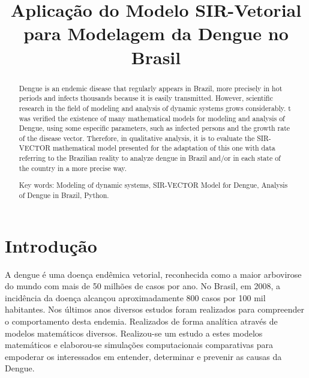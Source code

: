 \documentclass[conference]{IEEEtran}
\begin{document}
\title{Aplicação do Modelo SIR-Vetorial para Modelagem da Dengue no Brasil}

\author{
}




\maketitle

\begin{abstract}
Dengue is an endemic disease that regularly appears in Brazil, more precisely in hot periods and infects thousands because it is easily transmitted. However, scientific research in the field of modeling and analysis of dynamic systems grows considerably. t was verified the existence of many mathematical models for modeling and analysis of Dengue, using some especific parameters, such as infected persons and the growth rate of the disease vector. Therefore, in qualitative analysis, it is to evaluate the SIR-VECTOR mathematical model presented for the adaptation of this one with data referring to the Brazilian reality to analyze dengue in Brazil and/or in each state of the country in a more precise way.

Key words: Modeling of dynamic systems, SIR-VECTOR Model for Dengue, Analysis of Dengue in Brazil, Python.
\end{abstract}


\IEEEpeerreviewmaketitle

\section{Introdução}

A dengue é uma doença endêmica vetorial, reconhecida como a maior arbovirose do mundo com mais de 50 milhões de casos por ano\cite{10.1371/journal.pone.0049085}. No Brasil, em 2008, a incidência da doença alcançou aproximadamente 800
casos por 100 mil habitantes\cite{bohm2016dengue}. Nos últimos anos diversos estudos foram realizados para compreender o comportamento desta endemia. Realizados de forma analítica através de modelos matemáticos diversos\cite{kermack1927contribution,bailey1975mathematical,daley2001epidemic,brauer2001mathematical,nishiura2006mathematical,10.1371/journal.pone.0049085}. Realizou-se um estudo a estes modelos matemáticos e elaborou-se simulações computacionais comparativas para empoderar os interessados em entender, determinar e prevenir as causas da Dengue.
\end{document}
